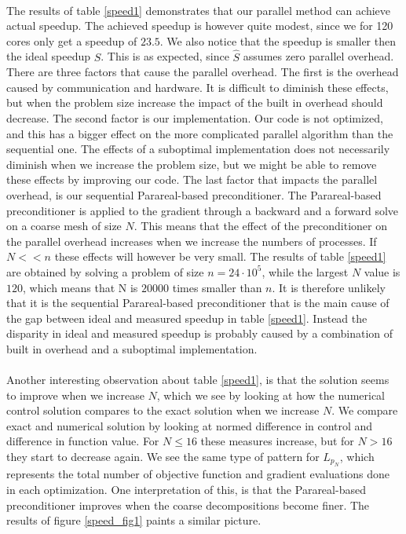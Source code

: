 \noindent
\\
The results of table \ref{speed1} demonstrates that our parallel method can achieve actual speedup. The achieved speedup is however quite modest, since we for 120 cores only get a speedup of $23.5$. We also notice that the speedup is smaller then the ideal speedup $\hat S$. This is as expected, since $\hat S$ assumes zero parallel overhead. There are three factors that cause the parallel overhead. The first is the overhead caused by communication and hardware. It is difficult to diminish these effects, but when the problem size increase the impact of the built in overhead should decrease. The second factor is our implementation. Our code is not optimized, and this has a bigger effect on the more complicated parallel algorithm than the sequential one. The effects of a suboptimal implementation does not necessarily diminish when we increase the problem size, but we might be able to remove these effects by improving our code. The last factor that impacts the parallel overhead, is our sequential Parareal-based preconditioner. The Parareal-based preconditioner is applied to the gradient through a backward and a forward solve on a coarse mesh of size $N$. This means that the effect of the preconditioner on the parallel overhead increases when we increase the numbers of processes. If $N<<n$ these effects will however be very small. The results of table \ref{speed1} are obtained by solving a problem of size $n=24\cdot 10^5$, while the largest $N$ value is $120$, which means that N is $20000$ times smaller than $n$. It is therefore unlikely that it is the sequential Parareal-based preconditioner that is the main cause of the gap between ideal and measured speedup in table \ref{speed1}. Instead the disparity in ideal and measured speedup is probably caused by a combination of built in overhead and a suboptimal implementation.
\\
\\
Another interesting observation about table \ref{speed1}, is that the solution seems to improve when we increase $N$, which we see by looking at how the numerical control solution compares to the exact solution when we increase $N$. We compare exact and numerical solution by looking at normed difference in control and difference in function value. For $N\leq16$ these measures increase, but for $N>16$ they start to decrease again. We see the same type of pattern for $L_{p_N}$, which represents the total number of objective function and gradient evaluations done in each optimization. One interpretation of this, is that the Parareal-based preconditioner improves when the coarse decompositions become finer. The results of figure \ref{speed_fig1} paints a similar picture.
